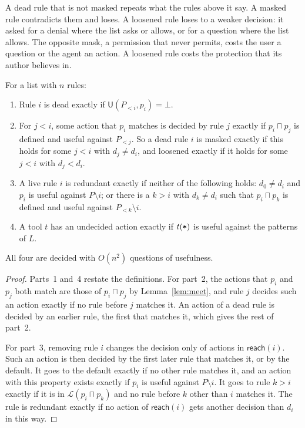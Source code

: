 \documentclass[acmsmall,nonacm,screen]{acmart}
\newcommand{\kw}[1]{\mathsf{#1}}
\newcommand{\rest}{\textup{\texttt{*}}}
\newcommand{\lang}[1]{\mathcal{L}(#1)}
\newcommand{\U}{\kw{U}}
\newcommand{\meet}{\sqcap}
\newcommand{\reach}{\kw{reach}}
\begin{document}
A dead rule that is not masked repeats what the rules above it say. A masked rule contradicts
them and loses. A loosened rule loses to a weaker decision: it asked for a denial where the
list asks or allows, or for a question where the list allows. The opposite mask, a permission
that never permits, costs the user a question or the agent an action. A loosened rule costs
the protection that its author believes in.

\begin{theorem}\label{thm:diagnoses}
For a list with $n$ rules:
\begin{enumerate}
\item Rule $i$ is dead exactly if $\U(P_{<i}, p_i) = \bot$.
\item For $j < i$, some action that $p_i$ matches is decided by rule $j$ exactly if $p_i
  \meet p_j$ is defined and useful against $P_{<j}$. So a dead rule $i$ is masked exactly if
  this holds for some $j < i$ with $d_j \ne d_i$, and loosened exactly if it holds for some
  $j < i$ with $d_j < d_i$.
\item A live rule $i$ is redundant exactly if neither of the following holds: $d_0 \ne d_i$
  and $p_i$ is useful against $P \setminus i$; or there is a $k > i$ with $d_k \ne d_i$ such
  that $p_i \meet p_k$ is defined and useful against $P_{<k} \setminus i$.
\item A tool $t$ has an undecided action exactly if $t(\rest)$ is useful against the patterns
  of $L$.
\end{enumerate}
All four are decided with $O(n^2)$ questions of usefulness.
\end{theorem}

\begin{proof}
Parts~1 and~4 restate the definitions. For part~2, the actions that $p_i$ and $p_j$ both
match are those of $p_i \meet p_j$ by Lemma~\ref{lem:meet}, and rule $j$ decides such an
action exactly if no rule before $j$ matches it. An action of a dead rule is decided by an
earlier rule, the first that matches it, which gives the rest of part~2.

For part~3, removing rule $i$ changes the decision only of actions in $\reach(i)$. Such an
action is then decided by the first later rule that matches it, or by the default. It goes to
the default exactly if no other rule matches it, and an action with this property exists
exactly if $p_i$ is useful against $P \setminus i$. It goes to rule $k > i$ exactly if it is
in $\lang{p_i \meet p_k}$ and no rule before $k$ other than $i$ matches it. The rule is
redundant exactly if no action of $\reach(i)$ gets another decision than $d_i$ in this way.
\end{proof}
\end{document}
